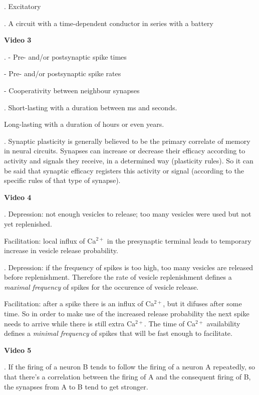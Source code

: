 \documentclass[a4paper,12pt]{article}
\begin{document}
. Excitatory

. A circuit with a time-dependent conductor in series with a battery


\vspace{0.5cm}

\noindent\normalsize\textbf{Video 3}


. - Pre- and/or postsynaptic spike times

- Pre- and/or postsynaptic spike rates

- Cooperativity between neighbour synapses

. Short-lasting with a duration between ms and seconds.

Long-lasting with a duration of hours or even years.

. Synaptic plasticity is generally believed to be the primary correlate of memory in neural circuits. Synapses can increase or decrease their efficacy according to activity and signals they receive, in a determined way (plasticity rules). So it can be said that synaptic efficacy registers this activity or signal (according to the specific rules of that type of synapse).


\vspace{0.5cm}

\noindent\normalsize\textbf{Video 4}


. Depression: not enough vesicles to release; too many vesicles were used but not yet replenished.

Facilitation: local influx of Ca$^{2+}$ in the presynaptic terminal leads to temporary increase in vesicle release probability.

. Depression: if the frequency of spikes is too high, too many vesicles are released before replenishment. Therefore the rate of vesicle replenishment defines a \emph{maximal frequency} of spikes for the occurence of vesicle release.

Facilitation: after a spike there is an influx of Ca$^{2+}$, but it difuses after some time. So in order to make use of the increased release probability the next spike needs to arrive while there is still extra Ca$^{2+}$. The time of Ca$^{2+}$ availability defines a \emph{minimal frequency} of spikes that will be fast enough to facilitate.

\vspace{0.5cm}

\noindent\normalsize\textbf{Video 5}


. If the firing of a neuron B tends to follow the firing of a neuron A repeatedly, so that there's a correlation between the firing of A and the consequent firing of B, the synapses from A to B tend to get stronger. 
\end{document}
